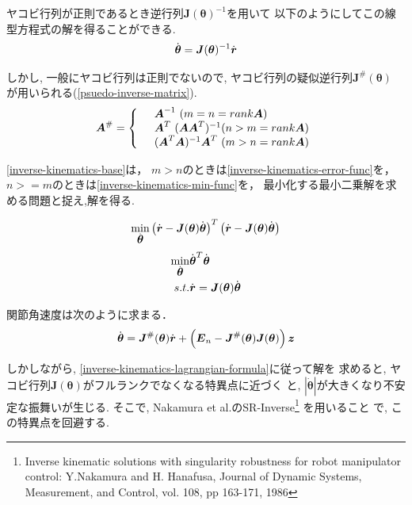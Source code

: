 ヤコビ行列が正則であるとき逆行列$\bm{J}(\bm{\theta})^{-1}$を用いて
以下のようにしてこの線型方程式の解を得ることができる.
\begin{eqnarray}
  \dot{\bm{\theta}} = \bm{J}(\bm{\theta})^{-1}\dot{\bm{r}}
  \eqlabel{inverse-kinematics}
\end{eqnarray}

しかし, 一般にヤコビ行列は正則でないので,
ヤコビ行列の疑似逆行列$\bm{J}^{\#}(\bm{\theta})$
が用いられる(\eqref{psuedo-inverse-matrix}).
\begin{eqnarray}
 \bm{A}^{\#} = \left\{
                \begin{array}{l l}
                 & \bm{A}^{-1} \ ( m = n = rank \bm{A}) \\
                 & \bm{A}^T \ (\bm{A}\bm{A}^T)^{-1} ( n > m = rank \bm{A}) \\
                 & (\bm{A}^T\bm{A})^{-1}\bm{A}^T \ ( m > n = rank \bm{A})
                \end{array}
	  \right.
 \eqlabel{psuedo-inverse-matrix}
\end{eqnarray}

\eqref{inverse-kinematics-base}は，
$m>n$のときは\eqref{inverse-kinematics-error-func}を，
$n>=m$のときは\eqref{inverse-kinematics-min-func}を，
最小化する最小二乗解を求める問題と捉え,解を得る.

\begin{eqnarray}
 \min_{\dot{\bm{\theta}}} \left(\dot{\bm{r}} - \bm{J}(\bm{\theta})\dot{\bm{\theta}}\right)^{T}
\left(\dot{\bm{r}} - \bm{J}(\bm{\theta})\dot{\bm{\theta}}\right)
 \eqlabel{inverse-kinematics-error-func}
\end{eqnarray}
\begin{eqnarray}
 \min_{\dot{\bm{\theta}}} & \dot{\bm{\theta}}^{T}\dot{\bm{\theta}}\\
\nonumber s.t. & \dot{\bm{r}} = \bm{J}(\bm{\theta})\dot{\bm{\theta}}
 \eqlabel{inverse-kinematics-min-func}
\end{eqnarray}

関節角速度は次のように求まる．
\begin{eqnarray}
 \dot{\bm{\theta}} = \bm{J}^{\#}(\bm{\theta})\dot{\bm{r}} + 
  \left(\bm{E}_n - \bm{J}^{\#}(\bm{\theta})\bm{J}(\bm{\theta})\right)\bm{z}
  \eqlabel{inverse-kinematics-lagrangian-formula}
\end{eqnarray}

しかしながら, \eqref{inverse-kinematics-lagrangian-formula}に従って解を
求めると, ヤコビ行列$\bm{J}(\bm{\theta})$がフルランクでなくなる特異点に近づく
と, $\left|\dot{\bm{\theta}}\right|$が大きくなり不安定な振舞いが生じる.
そこで, Nakamura et al.のSR-Inverse\footnote{
Inverse kinematic solutions with singularity robustness for robot
manipulator control: Y.Nakamura and H. Hanafusa, Journal of Dynamic Systems, Measurement, and Control,
vol. 108, pp 163-171, 1986
}
を用いること
で, この特異点を回避する.

